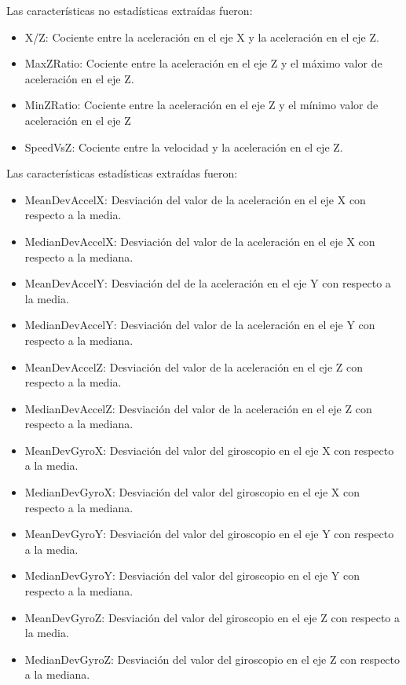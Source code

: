 		Las características no estadísticas extraídas fueron:\\

		\begin{itemize}
			\item X/Z: Cociente entre la aceleración en el eje X y la aceleración en el eje Z.
			\item MaxZRatio: Cociente entre la aceleración en el eje Z y el máximo valor de aceleración en el eje Z.
			\item MinZRatio: Cociente entre la aceleración en el eje Z y el mínimo valor de aceleración en el eje Z
			\item SpeedVsZ: Cociente entre la velocidad y la aceleración en el eje Z.
		\end{itemize}

		Las características estadísticas extraídas fueron:\\

		\begin{itemize}
			\item MeanDevAccelX: Desviación del valor de la aceleración en el eje X con respecto a la media.
			\item MedianDevAccelX: Desviación del valor de la aceleración en el eje X con respecto a la mediana.
			\item MeanDevAccelY: Desviación del de la aceleración en el eje Y con respecto a la media.
			\item MedianDevAccelY: Desviación del valor de la aceleración en el eje Y con respecto a la mediana.
			\item MeanDevAccelZ: Desviación del valor de la aceleración en el eje Z con respecto a la media.
			\item MedianDevAccelZ: Desviación del valor de la aceleración en el eje Z con respecto a la mediana.
			\item MeanDevGyroX: Desviación del valor del giroscopio en el eje X con respecto a la media.
			\item MedianDevGyroX: Desviación del valor del giroscopio en el eje X con respecto a la mediana.
			\item MeanDevGyroY: Desviación del valor del giroscopio en el eje Y con respecto a la media.
			\item MedianDevGyroY: Desviación del valor del giroscopio en el eje Y con respecto a la mediana.
			\item MeanDevGyroZ: Desviación del valor del giroscopio en el eje Z con respecto a la media.
			\item MedianDevGyroZ: Desviación del valor del giroscopio en el eje Z con respecto a la mediana.
		\end{itemize}

